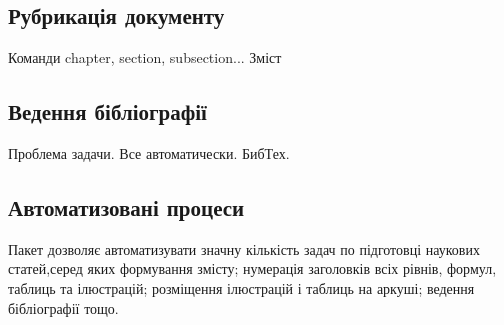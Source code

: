 \subsection{Рубрикація документу}
Команди chapter, section, subsection...
Зміст
%
%
\subsection{Ведення бібліографії}
Проблема задачи.
Все автоматически.
БибТех.
%
%
\subsection{Автоматизовані процеси}
Пакет   дозволяє   автоматизувати   значну   кількість  задач  по  підготовці наукових статей,серед яких формування змісту; нумерація заголовків всіх рівнів, формул,  таблиць  та  ілюстрацій;  розміщення  ілюстрацій  і  таблиць  на  аркуші; ведення бібліографії тощо.
